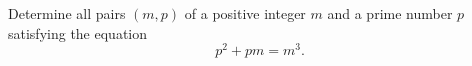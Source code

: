 Determine all pairs $(m,p)$ of a positive integer $m$ and a prime number $p$ satisfying the equation
$$p^2+pm= m^3.$$
